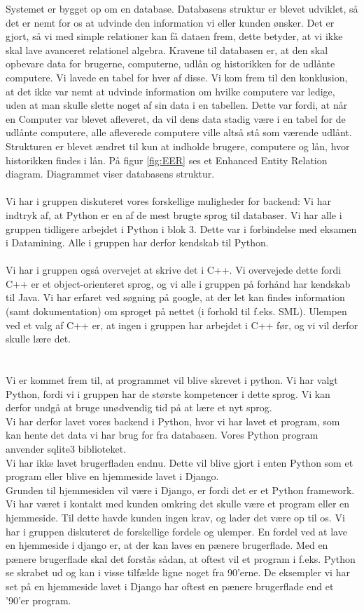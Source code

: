\documentclass[a4paper]{article}
\begin{document}
Systemet er bygget op om en database. Databasens struktur er blevet udviklet, så det er nemt for os at udvinde den information vi eller kunden ønsker. Det er gjort, så vi med simple relationer kan få dataen frem, dette betyder, at vi ikke skal lave avanceret relationel algebra. Kravene til databasen er, at den skal opbevare data for brugerne, computerne, udlån og historikken for de udlånte computere. Vi lavede en tabel for hver af disse. Vi kom frem til den konklusion, at det ikke var nemt at udvinde information om hvilke computere var ledige, uden at man skulle slette noget af sin data i en tabellen. Dette var fordi, at når en Computer var blevet afleveret, da vil dens data stadig være i en tabel for de udlånte computere, alle afleverede computere ville altså stå som værende udlånt. Strukturen er blevet ændret til kun at indholde brugere, computere og lån, hvor historikken findes i lån. På figur \ref{fig:EER} ses et Enhanced Entity Relation diagram. Diagrammet viser databasens struktur.  \\ \\
Vi har i gruppen diskuteret vores forskellige muligheder for backend:
Vi har indtryk af, at Python er en af de mest brugte sprog til databaser. Vi har alle i gruppen tidligere arbejdet i Python i blok 3. Dette var i forbindelse med eksamen i Datamining. Alle i gruppen har derfor kendskab til Python.\\ \\
Vi har i gruppen også overvejet at skrive det i C++. Vi overvejede dette fordi C++ er et object-orienteret sprog, og vi alle i gruppen på forhånd har kendskab til Java. Vi har erfaret ved søgning på google, at der let kan findes information (samt dokumentation) om sproget på nettet (i forhold til f.eks. SML). Ulempen ved et valg af C++ er, at ingen i gruppen har arbejdet i C++ før, og vi vil derfor skulle lære det. \\ \\ \\
Vi er kommet frem til, at programmet vil blive skrevet i python. Vi har valgt Python, fordi vi i gruppen har de største kompetencer i dette sprog. Vi kan derfor undgå at bruge unødvendig tid på at lære et nyt sprog. \\
Vi har derfor lavet vores backend i Python, hvor vi har lavet et program, som kan hente det data vi har brug for fra databasen. Vores Python program anvender sqlite3 biblioteket. \\
Vi har ikke lavet brugerfladen endnu. Dette vil blive gjort i enten Python som et program eller blive en hjemmeside lavet i Django.\\ Grunden til hjemmesiden vil være i Django, er fordi det er et Python framework. Vi har været i kontakt med kunden omkring det skulle være et program eller en hjemmeside. Til dette havde kunden ingen krav, og lader det være op til os. Vi har i gruppen diskuteret de forskellige fordele og ulemper. En fordel ved at lave en hjemmeside i django er, at der kan laves en pænere brugerflade. Med en pænere brugerflade skal det forstås sådan, at oftest vil et program i f.eks. Python se skrabet ud og kan i visse tilfælde ligne noget fra 90'erne. De eksempler vi har set på en hjemmeside lavet i Django har oftest en pænere brugerflade end et '90'er program. \\
\end{document}

